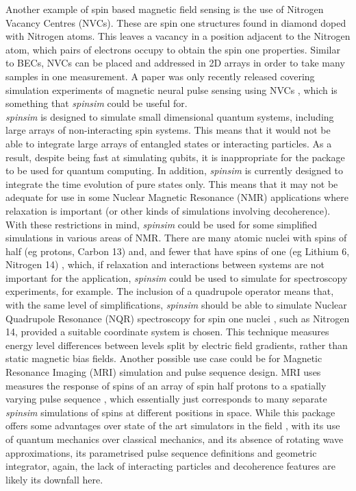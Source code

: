 \documentclass{jors}
\begin{document}
		Another example of spin based magnetic field sensing is the use of Nitrogen Vacancy Centres (NVCs). These are spin one structures found in diamond doped with Nitrogen atoms. This leaves a vacancy in a position adjacent to the Nitrogen atom, which pairs of electrons occupy to obtain the spin one properties. Similar to BECs, NVCs can be placed and addressed in 2D arrays in order to take many samples in one measurement. A paper was only recently released covering simulation experiments of magnetic neural pulse sensing using NVCs \cite{parashar_axon_2020}, which is something that \emph{spinsim} could be useful for.\\

		\emph{spinsim} is designed to simulate small dimensional quantum systems, including large arrays of non-interacting spin systems. This means that it would not be able to integrate large arrays of entangled states or interacting particles. As a result, despite being fast at simulating qubits, it is inappropriate for the package to be used for quantum computing. In addition, \emph{spinsim} is currently designed to integrate the time evolution of pure states only. This means that it may not be adequate for use in some Nuclear Magnetic Resonance (NMR) applications where relaxation \cite{veshtort_spinevolution_2006} is important (or other kinds of simulations involving decoherence).\\

		With these restrictions in mind, \emph{spinsim} could be used for some simplified simulations in various areas of NMR. There are many atomic nuclei with spins of half (eg protons, Carbon 13) and, and fewer that have spins of one (eg Lithium 6, Nitrogen 14) \cite{fuller_nuclear_1976}, which, if relaxation and interactions between systems are not important for the application, \emph{spinsim} could be used to simulate for spectroscopy experiments, for example. The inclusion of a quadrupole operator means that, with the same level of simplifications, \emph{spinsim} should be able to simulate Nuclear Quadrupole Resonance (NQR) spectroscopy for spin one nuclei \cite{bain_nqr_2004}, such as Nitrogen 14, provided a suitable coordinate system is chosen. This technique measures energy level differences between levels split by electric field gradients, rather than static magnetic bias fields. Another possible use case could be for Magnetic Resonance Imaging (MRI) simulation and pulse sequence design. MRI uses measures the response of spins of an array of spin half protons to a spatially varying pulse sequence \cite{mckinnon_physics_1998}, which essentially just corresponds to many separate \emph{spinsim} simulations of spins at different positions in space. While this package offers some advantages over state of the art simulators in the field \cite{kose_fast_2019}, with its use of quantum mechanics over classical mechanics, and its absence of rotating wave approximations, its parametrised pulse sequence definitions and geometric integrator, again, the lack of interacting particles and decoherence features are likely its downfall here.
\end{document}
